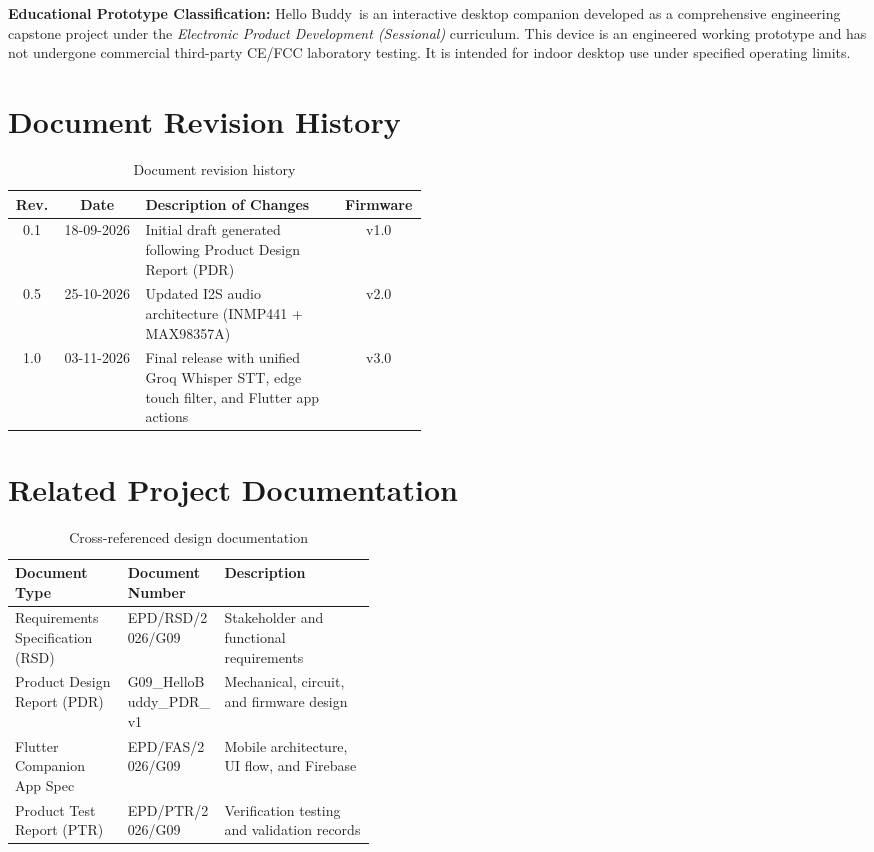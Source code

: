 \documentclass[11pt,a4paper,oneside]{report}
\newcommand{\hdr}[1]{\cellcolor{LightBlue}\textbf{#1}}
\newcommand{\ProductName}{Hello Buddy}
\newcommand{\FWVer}{3.0}
\begin{document}
\begin{notice}
\textbf{Educational Prototype Classification:} \ProductName\ is an interactive desktop companion developed as a comprehensive engineering capstone project under the \emph{Electronic Product Development (Sessional)} curriculum. This device is an engineered working prototype and has not undergone commercial third-party CE/FCC laboratory testing. It is intended for indoor desktop use under specified operating limits.
\end{notice}

\section*{Document Revision History}
\begin{table}[H]\centering\small
\caption{Document revision history}
\begin{tabular}{|c|c|p{0.48\linewidth}|c|}\hline
\hdr{Rev.} & \hdr{Date} & \hdr{Description of Changes} & \hdr{Firmware}\\ \hline
0.1 & 18-09-2026 & Initial draft generated following Product Design Report (PDR) & v1.0 \\ \hline
0.5 & 25-10-2026 & Updated I2S audio architecture (INMP441 + MAX98357A) & v2.0 \\ \hline
1.0 & 03-11-2026 & Final release with unified Groq Whisper STT, edge touch filter, and Flutter app actions & v\FWVer \\ \hline
\end{tabular}
\end{table}

\section*{Related Project Documentation}
\begin{table}[H]\centering\small
\caption{Cross-referenced design documentation}
\begin{tabular}{|l|l|p{0.42\linewidth}|}\hline
\hdr{Document Type} & \hdr{Document Number} & \hdr{Description}\\ \hline
Requirements Specification (RSD) & EPD/RSD/2026/G09 & Stakeholder and functional requirements \\ \hline
Product Design Report (PDR) & G09\_HelloBuddy\_PDR\_v1 & Mechanical, circuit, and firmware design \\ \hline
Flutter Companion App Spec & EPD/FAS/2026/G09 & Mobile architecture, UI flow, and Firebase \\ \hline
Product Test Report (PTR) & EPD/PTR/2026/G09 & Verification testing and validation records \\ \hline
\end{tabular}
\end{table}
\end{document}
